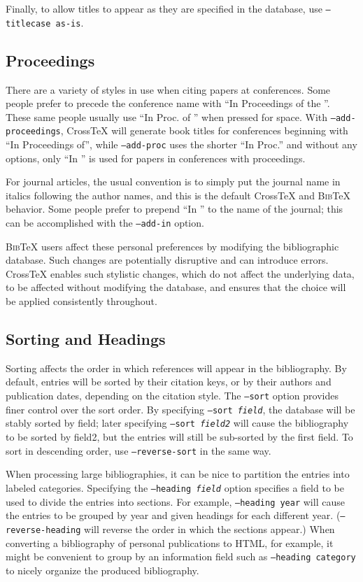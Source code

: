 \documentclass{article}
\newcommand{\XTX}{Cross\TeX}
\newcommand{\BibTeX}{\textsc{Bib}\TeX}
\begin{document}
Finally, to allow titles to appear as they are specified in the database,
use \texttt{--titlecase as-is}.

\subsection{Proceedings}

There are a variety of styles in use when citing papers at
conferences. Some people prefer to precede the conference name with
``In Proceedings of the ''.  These same people usually use ``In Proc. of
'' when pressed for space.  With \texttt{--add-proceedings}, \XTX{} will
generate book titles for conferences beginning with ``In Proceedings of'',
while \texttt{--add-proc} uses the shorter ``In Proc.'' and without any
options, only ``In '' is used for papers in conferences with proceedings.

For journal articles, the usual convention is to simply put the journal
name in italics following the author names, and this is the default \XTX{}
and \BibTeX{} behavior. Some people prefer to prepend ``In '' to the
name of the journal; this can be accomplished with the \texttt{--add-in}
option.

\BibTeX{} users affect these personal preferences by modifying the
bibliographic database. Such changes are potentially disruptive and can
introduce errors.  \XTX{} enables such stylistic changes, which do not
affect the underlying data, to be affected without modifying the database,
and ensures that the choice will be applied consistently throughout.

\subsection{Sorting and Headings}

Sorting affects the order in which references will appear in the
bibliography.  By default, entries will be sorted by their citation keys,
or by their authors and publication dates, depending on the citation
style.  The \texttt{--sort} option provides finer control over the
sort order. By specifying \texttt{--sort \textrm{\textit{field}}}, the
database will be stably sorted by field; later specifying \texttt{--sort
\textrm{\textit{field2}}} will cause the bibliography to be sorted by
field2, but the entries will still be sub-sorted by the first field. To
sort in descending order, use \texttt{--reverse-sort} in the same way.

When processing large bibliographies, it can be nice to partition
the entries into labeled categories. Specifying the \texttt{--heading
\textrm{\textit{field}}} option specifies a field to be used to divide
the entries into sections. For example, \texttt{--heading year} will
cause the entries to be grouped by year and given headings for each
different year. (\texttt{--reverse-heading} will reverse the order in
which the sections appear.) When converting a bibliography of personal
publications to HTML, for example, it might be convenient to group by an
information field such as \texttt{--heading category} to nicely organize
the produced bibliography.
\end{document}
